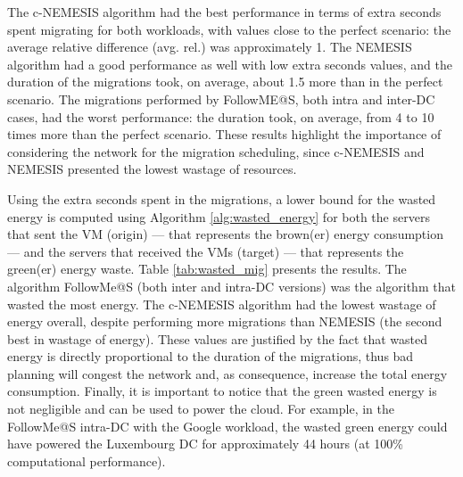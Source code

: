 The c-NEMESIS algorithm had the best performance in terms of extra seconds spent migrating for both workloads, with values close to the perfect scenario: the average relative difference (avg. rel.) was approximately 1. The NEMESIS algorithm had a good performance as well with low extra seconds values, and the duration of the migrations took, on average, about 1.5 more than in the perfect scenario. The migrations performed by FollowME@S, both intra and inter-DC cases, had the worst performance: the duration took, on average, from 4 to 10 times more than the perfect scenario. These results highlight the importance of considering the network for the migration scheduling, since c-NEMESIS and NEMESIS presented the lowest wastage of resources.
                      

Using the extra seconds spent in the migrations, a lower bound for the wasted energy is computed using Algorithm \ref{alg:wasted_energy} for both the servers that sent the VM (origin) --- that represents the brown(er) energy consumption --- and the servers that received the VMs (target) --- that represents the green(er) energy waste. Table \ref{tab:wasted_mig} presents the results. The algorithm FollowMe@S (both inter and intra-DC versions) was the algorithm that wasted the most energy. The c-NEMESIS algorithm had the lowest wastage of energy overall, despite performing more migrations than NEMESIS (the second best in wastage of energy). These values are justified by the fact that wasted energy is directly proportional to the duration of the migrations, thus bad planning will congest the network and, as consequence, increase the total energy consumption. Finally, it is important to notice that the green wasted energy is not negligible and can be used to power the cloud. For example, in the FollowMe@S intra-DC with the Google workload, the wasted green energy could have powered the Luxembourg DC for approximately 44 hours (at 100\% computational performance).



